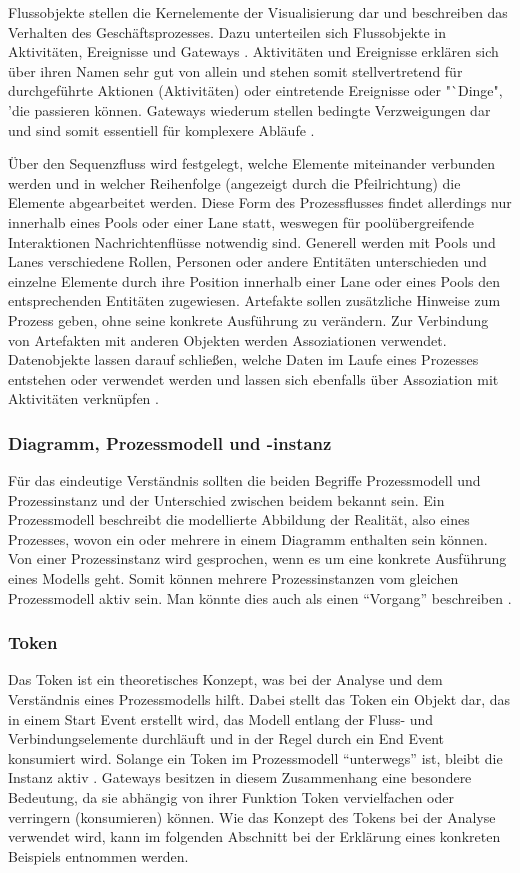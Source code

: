 \documentclass[a4paper,12pt]{report}
\begin{document}
Flussobjekte stellen die Kernelemente der Visualisierung dar und beschreiben das Verhalten des Geschäftsprozesses. Dazu unterteilen sich Flussobjekte in Aktivitäten, Ereignisse und Gateways \citep[vgl.][S. 29]{Laliwala2014}. Aktivitäten und Ereignisse erklären sich über ihren Namen sehr gut von allein und stehen somit stellvertretend für durchgeführte Aktionen (Aktivitäten) oder eintretende Ereignisse oder "`Dinge", 'die passieren können. Gateways wiederum stellen bedingte Verzweigungen dar und sind somit essentiell für komplexere Abläufe \citep[vgl.][S. 23]{Freund2014}.

Über den Sequenzfluss wird festgelegt, welche Elemente miteinander verbunden werden und in welcher Reihenfolge (angezeigt durch die Pfeilrichtung) die Elemente abgearbeitet werden. Diese Form des Prozessflusses findet allerdings nur innerhalb eines Pools oder einer Lane statt, weswegen für poolübergreifende Interaktionen Nachrichtenflüsse notwendig sind. Generell werden mit Pools und Lanes verschiedene Rollen, Personen oder andere Entitäten unterschieden und einzelne Elemente durch ihre Position innerhalb einer Lane oder eines Pools den entsprechenden Entitäten zugewiesen. Artefakte sollen zusätzliche Hinweise zum Prozess geben, ohne seine konkrete Ausführung zu verändern. Zur Verbindung von Artefakten mit anderen Objekten werden Assoziationen verwendet. Datenobjekte lassen darauf schließen, welche Daten im Laufe eines Prozesses entstehen oder verwendet werden und lassen sich ebenfalls über Assoziation mit Aktivitäten verknüpfen \citep[vgl.][S. 23f.]{Freund2014}. 
\subsubsection{Diagramm, Prozessmodell und -instanz}\label{subsubsec:BPMNModellInstanz}
Für das eindeutige Verständnis sollten die beiden Begriffe Prozessmodell und Prozessinstanz und der Unterschied zwischen beidem bekannt sein. Ein Prozessmodell beschreibt die modellierte Abbildung der Realität, also eines Prozesses, wovon ein oder mehrere in einem Diagramm enthalten sein können. Von einer Prozessinstanz wird gesprochen, wenn es um eine konkrete Ausführung eines Modells geht. Somit können mehrere Prozessinstanzen vom gleichen Prozessmodell aktiv sein. Man könnte dies auch als einen "`Vorgang"' beschreiben \citep[vgl.][S. 25f.]{Freund2014}.
\subsubsection{Token}\label{subsubsec:BPMNToken}
Das Token ist ein theoretisches Konzept, was bei der Analyse und dem Verständnis eines Prozessmodells hilft. Dabei stellt das Token ein Objekt dar, das in einem Start Event erstellt wird,  das Modell entlang der Fluss- und Verbindungselemente durchläuft und in der Regel durch ein End Event konsumiert wird. Solange ein Token im Prozessmodell "`unterwegs"' ist, bleibt die Instanz aktiv \citep[vgl.][S. 27]{OMG2011}. Gateways besitzen in diesem Zusammenhang eine besondere Bedeutung, da sie abhängig von ihrer Funktion Token vervielfachen oder verringern (konsumieren) können. Wie das Konzept des Tokens bei der Analyse verwendet wird, kann im folgenden Abschnitt bei der Erklärung eines konkreten Beispiels entnommen werden.
\end{document}
